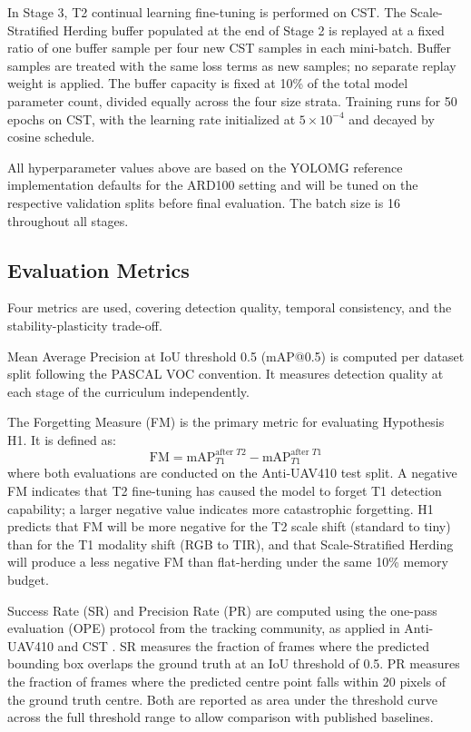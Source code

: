 \documentclass[nolinenumbering]{thesisdesign}
\begin{document}
In Stage 3, T2 continual learning fine-tuning is performed on CST. The Scale-Stratified Herding buffer populated at the end of Stage 2 is replayed at a fixed ratio of one buffer sample per four new CST samples in each mini-batch. Buffer samples are treated with the same loss terms as new samples; no separate replay weight is applied. The buffer capacity is fixed at 10\% of the total model parameter count, divided equally across the four size strata. Training runs for 50 epochs on CST, with the learning rate initialized at $5 \times 10^{-4}$ and decayed by cosine schedule.

All hyperparameter values above are based on the YOLOMG reference implementation defaults for the ARD100 setting \citep{guo_yolomg_2025} and will be tuned on the respective validation splits before final evaluation. The batch size is 16 throughout all stages.


\subsection{Evaluation Metrics}
\label{sec:metrics}

Four metrics are used, covering detection quality, temporal consistency, and the stability-plasticity trade-off.

Mean Average Precision at IoU threshold 0.5 (mAP@0.5) is computed per dataset split following the PASCAL VOC convention. It measures detection quality at each stage of the curriculum independently.

The Forgetting Measure (FM) is the primary metric for evaluating Hypothesis H1. It is defined as:
\[
    \text{FM} = \text{mAP}_{T1}^{\text{after } T2} - \text{mAP}_{T1}^{\text{after } T1}
\]
where both evaluations are conducted on the Anti-UAV410 test split. A negative FM indicates that T2 fine-tuning has caused the model to forget T1 detection capability; a larger negative value indicates more catastrophic forgetting. H1 predicts that FM will be more negative for the T2 scale shift (standard to tiny) than for the T1 modality shift (RGB to TIR), and that Scale-Stratified Herding will produce a less negative FM than flat-herding under the same 10\% memory budget.

Success Rate (SR) and Precision Rate (PR) are computed using the one-pass evaluation (OPE) protocol from the tracking community, as applied in Anti-UAV410 \citep{bohuang_410} and CST \citep{xie2025cstantiuavthermalinfrared}. SR measures the fraction of frames where the predicted bounding box overlaps the ground truth at an IoU threshold of 0.5. PR measures the fraction of frames where the predicted centre point falls within 20 pixels of the ground truth centre. Both are reported as area under the threshold curve across the full threshold range to allow comparison with published baselines.
\end{document}
